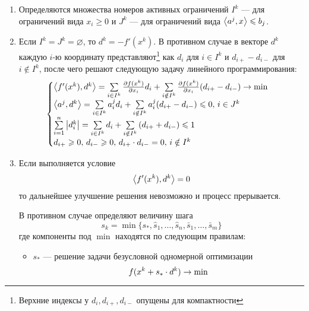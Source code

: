 \begin{enumerate}
  \renewcommand{\labelenumi}{\textbf{Шаг \arabic{enumi}.}}
\item Определяются множества номеров активных ограничений $I^k$ — для
  ограничений вида $x_i \geq 0$ и $J^k$ — для ограничений вида
  ${\left \langle a^j,x \right \rangle} \leqslant b_j$.
\item Если $I^k=J^k = \varnothing$, то $d^k=-f'(x^k)$. В противном
  случае в векторе $d^k$ каждую $i$-ю координату
  представляют\footnote{Верхние индексы у $d_i, d_{i+}, d_{i-}$
    опущены для компактности} как $d_i$ для $i \in I^k$ и
  $d_{i+}-d_{i-}$ для $i \notin I^k$, после чего решают следующую
  задачу линейного программирования:
  \begin{equation}
    \label{eq:zoutendijk-linprog}
    \begin{cases}
      {\left \langle f'(x^k), d^k \right \rangle} = 
      \sum\limits_{i\in I^k}{\frac{\partial{f(x^k)}}{\partial{x_i}}d_i} + 
      \sum\limits_{i \notin I^k}{\frac{\partial{f(x^k)}}{\partial{x_i}}(d_{i+}-d_{i-})}
      \to \min\\
      
      {\left \langle a^j, d^k \right \rangle} = 
      \sum\limits_{i\in I^k}{a^j_id_i} +
      \sum\limits_{i \notin I^k}{a^j_i(d_{i+}-d_{i-})} \leqslant 0,
      \, i\in J^k \\
      
      \sum\limits_{i=1}^n\left \lvert{d_i^k}\right \rvert = \sum\limits_{i\in I^k}{d_i}+
      \sum\limits_{i \notin I^k}{\left( d_{i+} + d_{i-}\right)} \leqslant 1\\
      
      d_{i+} \geqslant 0,\, d_{i-} \geqslant 0,\,d_{i+}\cdot d_{i-}=0,\, i\notin I^k
    \end{cases}
  \end{equation}
\item Если выполняется условие
  \begin{equation}
    \label{eq:zoutendijk-halt}
    {\left \langle f'(x^k), d^k \right \rangle} = 0
  \end{equation}
  то дальнейшее улучшение решения невозможно и процесс прерывается.

  В противном случае определяют величину шага
  \begin{equation}
    \label{eq:zoutendijk-step}
    s_k =
    \min\{s_*,\hat{s}_1,\dotsc,\hat{s}_n,\bar{s}_1,\dotsc,\bar{s}_m\}
  \end{equation}
  где компоненты под $\min$ находятся по следующим правилам:
  \begin{itemize}
  \item $s_*$ — решение задачи безусловной одномерной оптимизации
    \begin{equation*} 
      f(x^k+s_* \cdot d^k) \to \min
    \end{equation*}


\end{itemize}
\end{enumerate}
